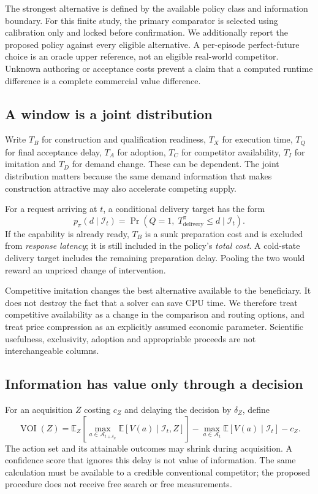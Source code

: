 \documentclass[11pt,a4paper]{article}
\begin{document}
The strongest alternative is defined by the available policy class and information boundary. For this finite study, the primary comparator is selected using calibration only and locked before confirmation. We additionally report the proposed policy against every eligible alternative. A per-episode perfect-future choice is an oracle upper reference, not an eligible real-world competitor. Unknown authoring or acceptance costs prevent a claim that a computed runtime difference is a complete commercial value difference.

\subsection{A window is a joint distribution}
Write $T_B$ for construction and qualification readiness, $T_X$ for execution time, $T_Q$ for final acceptance delay, $T_A$ for adoption, $T_C$ for competitor availability, $T_I$ for imitation and $T_D$ for demand change. These can be dependent. The joint distribution matters because the same demand information that makes construction attractive may also accelerate competing supply.

For a request arriving at $t$, a conditional delivery target has the form
\begin{equation}
p_\pi(d\mid\mathcal I_t)=\Pr\!\left(Q=1,\;T^\pi_{\mathrm{delivery}}\leq d\mid\mathcal I_t\right).
\end{equation}
If the capability is already ready, $T_B$ is a sunk preparation cost and is excluded from \emph{response latency}; it is still included in the policy's \emph{total cost}. A cold-state delivery target includes the remaining preparation delay. Pooling the two would reward an unpriced change of intervention.

Competitive imitation changes the best alternative available to the beneficiary. It does not destroy the fact that a solver can save CPU time. We therefore treat competitive availability as a change in the comparison and routing options, and treat price compression as an explicitly assumed economic parameter. Scientific usefulness, exclusivity, adoption and appropriable proceeds are not interchangeable columns.

\subsection{Information has value only through a decision}
For an acquisition $Z$ costing $c_Z$ and delaying the decision by $\delta_Z$, define
\begin{equation}
\operatorname{VOI}(Z)=\mathbb E_Z\!\left[\max_{a\in\mathcal A_{t+\delta_Z}}\mathbb E[V(a)\mid\mathcal I_t,Z]\right]
-\max_{a\in\mathcal A_t}\mathbb E[V(a)\mid\mathcal I_t]-c_Z.
\end{equation}
The action set and its attainable outcomes may shrink during acquisition. A confidence score that ignores this delay is not value of information. The same calculation must be available to a credible conventional competitor; the proposed procedure does not receive free search or free measurements.
\end{document}
